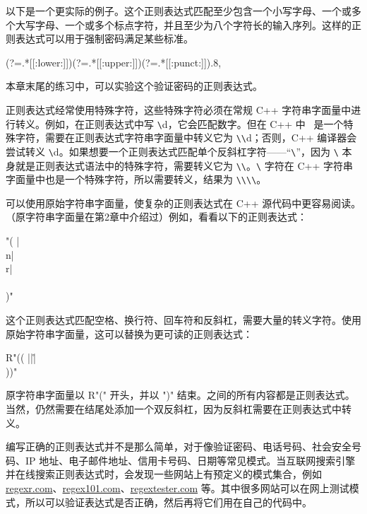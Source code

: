 以下是一个更实际的例子。这个正则表达式匹配至少包含一个小写字母、一个或多个大写字母、一个或多个标点字符，并且至少为八个字符长的输入序列。这样的正则表达式可以用于强制密码满足某些标准。

\begin{cpp}
(?=.*[[:lower:]])(?=.*[[:upper:]])(?=.*[[:punct:]]).{8,}
\end{cpp}

本章末尾的练习中，可以实验这个验证密码的正则表达式。


正则表达式经常使用特殊字符，这些特殊字符必须在常规 C++ 字符串字面量中进行转义。例如，在正则表达式中写 \verb|\|d，它会匹配数字。但在 C++ 中 \ 是一个特殊字符，需要在正则表达式字符串字面量中转义它为 \verb|\|\verb|\|d；否则，C++ 编译器会尝试转义 \verb|\|d。如果想要一个正则表达式匹配单个反斜杠字符——“\verb|\|”，因为 \verb|\| 本身就是正则表达式语法中的特殊字符，需要转义它为 \verb|\|\verb|\|。\verb|\| 字符在 C++ 字符串字面量中也是一个特殊字符，所以需要转义，结果为 \verb|\|\verb|\|\verb|\|\verb|\|。

可以使用原始字符串字面量，使复杂的正则表达式在 C++ 源代码中更容易阅读。（原字符串字面量在第2章中介绍过）例如，看看以下的正则表达式：

\begin{cpp}
"( |\\n|\\r|\\\\)"
\end{cpp}

这个正则表达式匹配空格、换行符、回车符和反斜杠，需要大量的转义字符。使用原始字符串字面量，这可以替换为更可读的正则表达式：

\begin{cpp}
R"(( |\n|\r|\\))"
\end{cpp}

原字符串字面量以 R"(" 开头，并以 ")" 结束。之间的所有内容都是正则表达式。当然，仍然需要在结尾处添加一个双反斜杠，因为反斜杠需要在正则表达式中转义。


编写正确的正则表达式并不是那么简单，对于像验证密码、电话号码、社会安全号码、IP 地址、电子邮件地址、信用卡号码、日期等常见模式。当互联网搜索引擎并在线搜索正则表达式时，会发现一些网站上有预定义的模式集合，例如 \href{http://regexr.com/}{regexr.com}、\href{http://regex101.com/}{regex101.com}、\href{http://regextester.com/}{regextester.com} 等。其中很多网站可以在网上测试模式，所以可以验证表达式是否正确，然后再将它们用在自己的代码中。


